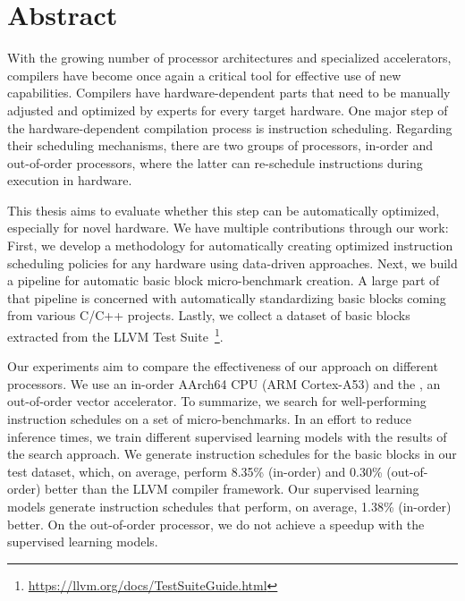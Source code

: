 \chapter*{Abstract}
With the growing number of processor architectures and specialized accelerators, compilers have become once again a critical tool for effective use of new capabilities.
Compilers have hardware-dependent parts that need to be manually adjusted and optimized by experts for every target hardware.
One major step of the hardware-dependent compilation process is instruction scheduling.
Regarding their scheduling mechanisms, there are two groups of processors, in-order and out-of-order processors, where the latter can re-schedule instructions during execution in hardware.

This thesis aims to evaluate whether this step can be automatically optimized, especially for novel hardware.
We have multiple contributions through our work:
First, we develop a methodology for automatically creating optimized instruction scheduling policies for any hardware using data-driven approaches.
Next, we build a pipeline for automatic basic block micro-benchmark creation.
A large part of that pipeline is concerned with automatically standardizing basic blocks coming from various C/C++ projects.
Lastly, we collect a dataset of basic blocks extracted from the LLVM Test Suite~\footnote{\url{https://llvm.org/docs/TestSuiteGuide.html}}.

Our experiments aim to compare the effectiveness of our approach on different processors.
We use an in-order AArch64 CPU (ARM Cortex-A53) and the \aurora{}, an out-of-order vector accelerator.
To summarize, we search for well-performing instruction schedules on a set of micro-benchmarks.
In an effort to reduce inference times, we train different supervised learning models with the results of the search approach.
We generate instruction schedules for the basic blocks in our test dataset, which, on average, perform 8.35\% (in-order) and 0.30\% (out-of-order) better than the LLVM compiler framework.
Our supervised learning models generate instruction schedules that perform, on average, 1.38\% (in-order) better.
On the out-of-order processor, we do not achieve a speedup with the supervised learning models.

